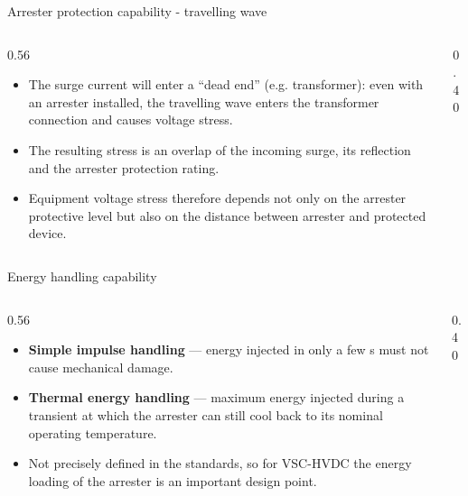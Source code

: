 \begin{frame}{Arrester protection capability - travelling wave}
  \begin{columns}[c,onlytextwidth]
    \begin{column}{0.56\textwidth}
      \begin{itemize}
        \setlength{\itemsep}{0.4em}
        \item The surge current will enter a ``dead end'' (e.g. transformer):
              even with an arrester installed, the travelling wave enters the
              transformer connection and causes voltage stress.
        \item The resulting stress is an overlap of the incoming surge, its
              reflection and the arrester protection rating.
        \item Equipment voltage stress therefore depends not only on the
              arrester protective level but also on the distance between
              arrester and protected device.
      \end{itemize}
    \end{column}
    \begin{column}{0.40\textwidth}
      \centering
    \end{column}
  \end{columns}
\end{frame}

\begin{frame}{Energy handling capability}
  \begin{columns}[c,onlytextwidth]
    \begin{column}{0.56\textwidth}
      \begin{itemize}
        \setlength{\itemsep}{0.4em}
        \item \textbf{Simple impulse handling} --- energy injected in only a
              few \textmu s must not cause mechanical damage.
        \item \textbf{Thermal energy handling} --- maximum energy injected
              during a transient at which the arrester can still cool back to
              its nominal operating temperature.
        \item Not precisely defined in the standards, so for VSC-HVDC the
              energy loading of the arrester is an important design point.
      \end{itemize}
    \end{column}
    \begin{column}{0.40\textwidth}
      \centering
    \end{column}
  \end{columns}
\end{frame}

